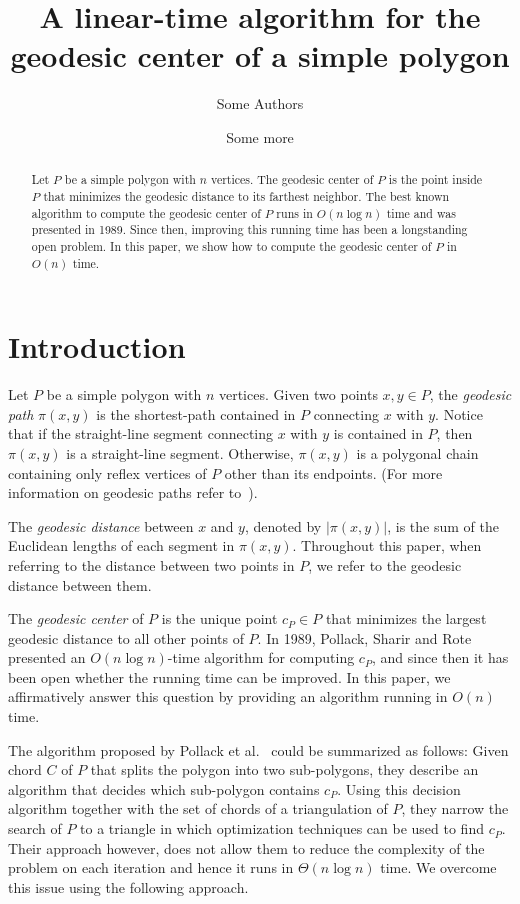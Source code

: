 \documentclass[a4paper,UKenglish]{lipics}
\title{A linear-time algorithm for the geodesic center of a simple polygon}
\author[1]{Some Authors}
\author[2]{Some more}
\affil[1]{Dummy University Computing Laboratory\\
  Address, Country\\
  \texttt{open@dummyuni.org}}
\affil[2]{Department of Informatics, Dummy College\\
  Address, Country\\
  \texttt{access@dummycollege.org}}
\newcommand{\cp}{\ensuremath{c_P}}
\newcommand{\g}[2]{\ensuremath{|\pi(#1, #2)|}}
\newcommand{\p}[2]{\ensuremath{\pi(#1, #2)}}
\begin{document}
\maketitle

\begin{abstract}
Let $P$ be a simple polygon with $n$ vertices. 
The geodesic center of $P$ is the point inside $P$ that minimizes the geodesic distance to its farthest neighbor. 
The best known algorithm to compute the geodesic center of $P$ runs in $O(n \log n)$ time and was presented in 1989. 
Since then, improving this running time has been a longstanding open problem.
In this paper, we show how to compute the geodesic center of $P$ in $O(n)$ time.
\end{abstract}



\section{Introduction}
Let $P$ be a simple polygon with $n$ vertices. 
Given two points $x,y\in P$, the \emph{geodesic path} $\p{x}{y}$ is the shortest-path contained in $P$ connecting $x$ with $y$. Notice that if the straight-line segment connecting $x$ with $y$ is contained in $P$, then $\p{x}{y}$ is a straight-line segment. Otherwise, $\p{x}{y}$ is a polygonal chain containing only reflex vertices of $P$ other than its endpoints. (For more information on geodesic paths refer to~\cite{m-gspno-00}).

The \emph{geodesic distance} between $x$ and $y$, denoted by $\g{x}{y}$, is the sum of the Euclidean lengths of each segment in $\p{x}{y}$.
Throughout this paper, when referring to the distance between two points in $P$, we refer to the geodesic distance between them.

The  \emph{geodesic center} of $P$ is the unique point $\cp\in P$ that minimizes the largest geodesic distance to all other points of $P$. 
In 1989, Pollack, Sharir and Rote~\cite{pollackComputingCenter} presented an $O(n\log n)$-time algorithm for computing $\cp$, and since then it has been open whether the running time can be improved. 
In this paper, we affirmatively answer this question by providing an algorithm running in $O(n)$ time. 

The algorithm proposed by Pollack et al.~\cite{pollackComputingCenter} could be summarized as follows: 
Given chord $C$ of $P$ that splits the polygon into two sub-polygons, they describe an algorithm that decides which sub-polygon contains $\cp$. Using this decision algorithm together with the set of chords of a triangulation of $P$, they narrow the search of $P$ to a triangle in which optimization techniques can be used to find $\cp$.
Their approach however, does not allow them to reduce the complexity of the problem on each iteration and hence it runs in $\Theta(n\log n)$ time. We overcome this issue using the following approach.
\end{document}
